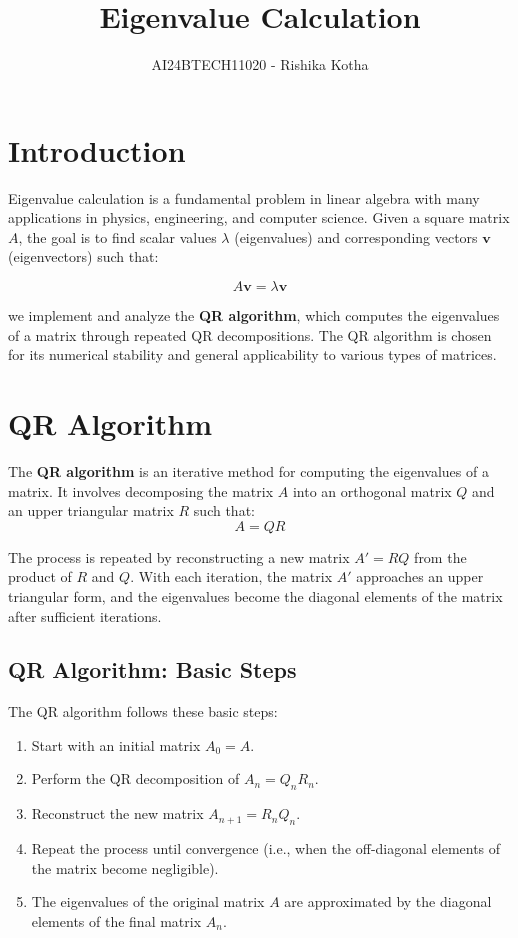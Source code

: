 \documentclass{article}
\title{Eigenvalue Calculation}
\author{AI24BTECH11020 - Rishika Kotha}
\date{}
\begin{document}
\maketitle

\section{Introduction}

Eigenvalue calculation is a fundamental problem in linear algebra with many applications in physics, engineering, and computer science. Given a square matrix \( A \), the goal is to find scalar values \( \lambda \) (eigenvalues) and corresponding vectors \( \mathbf{v} \) (eigenvectors) such that:

\[
A \mathbf{v} = \lambda \mathbf{v}
\]

 we implement and analyze the \textbf{QR algorithm}, which computes the eigenvalues of a matrix through repeated QR decompositions. The QR algorithm is chosen for its numerical stability and general applicability to various types of matrices.

\section{QR Algorithm}

The \textbf{QR algorithm} is an iterative method for computing the eigenvalues of a matrix. It involves decomposing the matrix \( A \) into an orthogonal matrix \( Q \) and an upper triangular matrix \( R \) such that:
\[
A = QR
\]

The process is repeated by reconstructing a new matrix \( A' = RQ \) from the product of \( R \) and \( Q \). With each iteration, the matrix \( A' \) approaches an upper triangular form, and the eigenvalues become the diagonal elements of the matrix after sufficient iterations.

\subsection{QR Algorithm: Basic Steps}
The QR algorithm follows these basic steps:
\begin{enumerate}
    \item Start with an initial matrix \( A_0 = A \).
    \item Perform the QR decomposition of \( A_n = Q_n R_n \).
    \item Reconstruct the new matrix \( A_{n+1} = R_n Q_n \).
    \item Repeat the process until convergence (i.e., when the off-diagonal elements of the matrix become negligible).
    \item The eigenvalues of the original matrix \( A \) are approximated by the diagonal elements of the final matrix \( A_n \).
\end{enumerate}
\end{document}

